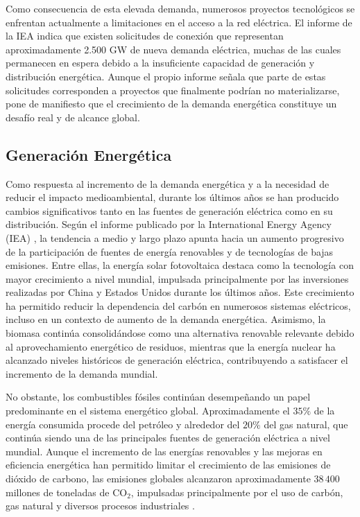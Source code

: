 Como consecuencia de esta elevada demanda, numerosos proyectos tecnológicos se enfrentan actualmente a limitaciones en el acceso a la red eléctrica. El informe de la IEA indica que existen solicitudes de conexión que representan aproximadamente 2.500 GW de nueva demanda eléctrica, muchas de las cuales permanecen en espera debido a la insuficiente capacidad de generación y distribución energética. Aunque el propio informe señala que parte de estas solicitudes corresponden a proyectos que finalmente podrían no materializarse, pone de manifiesto que el crecimiento de la demanda energética constituye un desafío real y de alcance global.

\subsection{Generación Energética}

Como respuesta al incremento de la demanda energética y a la necesidad de reducir el impacto medioambiental, durante los últimos años se han producido cambios significativos tanto en las fuentes de generación eléctrica como en su distribución. Según el informe publicado por la International Energy Agency (IEA) \cite{iae-report-generation}, la tendencia a medio y largo plazo apunta hacia un aumento progresivo de la participación de fuentes de energía renovables y de tecnologías de bajas emisiones. Entre ellas, la energía solar fotovoltaica destaca como la tecnología con mayor crecimiento a nivel mundial, impulsada principalmente por las inversiones realizadas por China y Estados Unidos durante los últimos años. Este crecimiento ha permitido reducir la dependencia del carbón en numerosos sistemas eléctricos, incluso en un contexto de aumento de la demanda energética. Asimismo, la biomasa continúa consolidándose como una alternativa renovable relevante debido al aprovechamiento energético de residuos, mientras que la energía nuclear ha alcanzado niveles históricos de generación eléctrica, contribuyendo a satisfacer el incremento de la demanda mundial.\

No obstante, los combustibles fósiles continúan desempeñando un papel predominante en el sistema energético global. Aproximadamente el $35\%$ de la energía consumida procede del petróleo y alrededor del $20\%$ del gas natural, que continúa siendo una de las principales fuentes de generación eléctrica a nivel mundial. Aunque el incremento de las energías renovables y las mejoras en eficiencia energética han permitido limitar el crecimiento de las emisiones de dióxido de carbono, las emisiones globales alcanzaron aproximadamente $38\,400$ millones de toneladas de CO$_2$, impulsadas principalmente por el uso de carbón, gas natural y diversos procesos industriales \cite{iae-report-generation}.

